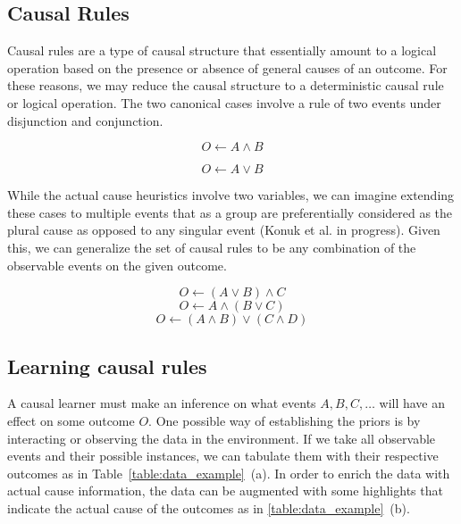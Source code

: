 \documentclass[10pt,letterpaper]{article}
\begin{document}
\subsection*{Causal Rules}

Causal rules are a type of causal structure that essentially amount to a logical operation based on the presence or absence of general causes of an outcome. 
For these reasons, we may reduce the causal structure to a deterministic causal rule or logical operation.
The two canonical cases involve a rule of two events under disjunction and
conjunction.

\begin{equation}\label{rule:conjunction}
O \leftarrow A \land B
\end{equation}

\begin{equation}\label{rule:disjunction}
O \leftarrow A \lor B
\end{equation}

While the actual cause heuristics involve two variables, we can imagine
extending these cases to multiple events that as a group are preferentially considered as the
plural cause as opposed to any singular event (Konuk et al. in progress). 
Given this, we can generalize the set of causal rules to be any
combination of the observable events on the given outcome.

$$ O \leftarrow (A \lor B )\land C$$
$$ O \leftarrow A \land (B \lor C )$$
$$ O \leftarrow (A \land B ) \lor ( C \land D)$$

\subsection*{Learning causal rules}

A causal learner must make an inference on what events $A,B,C,\dots$ will
have an effect on some outcome $O$.
One possible way of establishing the priors is by interacting or observing the data in the environment. If we take all observable events and their possible instances, we can tabulate them with their respective outcomes as in Table~\ref{table:data_example}~(a).
In order to enrich the data with actual cause information, the data can be augmented with some highlights that indicate the actual cause of the outcomes as in \ref{table:data_example}~(b). 
\end{document}
